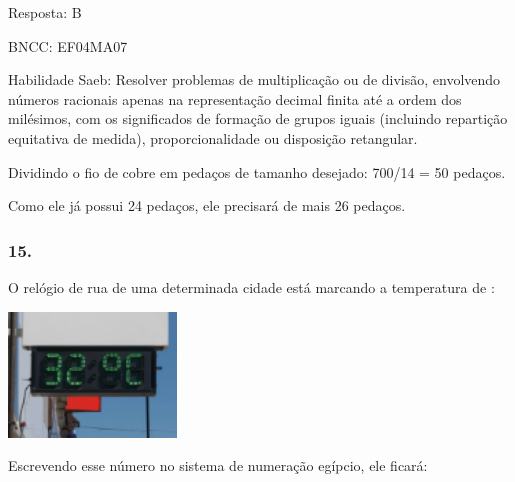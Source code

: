 Resposta: B

BNCC: EF04MA07

Habilidade Saeb: Resolver problemas de multiplicação ou de divisão,
envolvendo números racionais apenas na representação decimal finita até
a ordem dos milésimos, com os significados de formação de grupos iguais
(incluindo repartição equitativa de medida), proporcionalidade ou
disposição retangular.

Dividindo o fio de cobre em pedaços de tamanho desejado: 700/14 = 50
pedaços.

Como ele já possui 24 pedaços, ele precisará de mais 26 pedaços.

\subsubsection{15.}\label{section-186}

O relógio de rua de uma determinada cidade está marcando a temperatura
de :

\includegraphics[width=1.75833in,height=1.31518in]{media/image162.png}

Escrevendo esse número no sistema de numeração egípcio, ele ficará:

